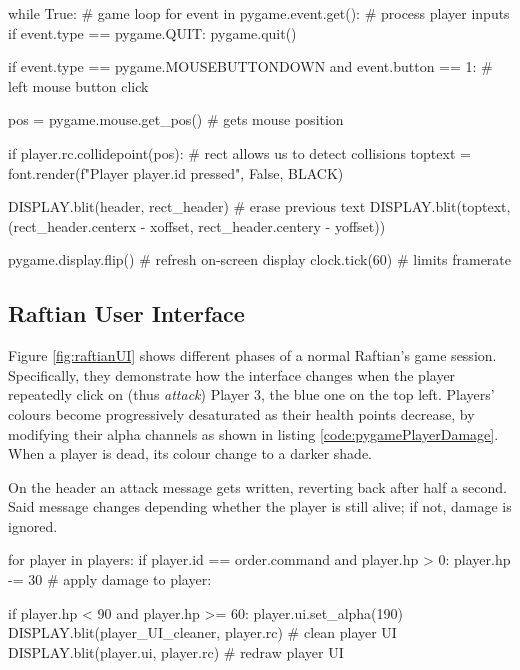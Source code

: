 \begin{python}[label={code:pygameLoop}, caption={All interactions and frame-by-frame rendering happen in the game loop}]
while True: # game loop
    for event in pygame.event.get():    # process player inputs
        if event.type == pygame.QUIT:
            pygame.quit()

        if event.type == pygame.MOUSEBUTTONDOWN and event.button == 1:  # left mouse button click

            pos = pygame.mouse.get_pos() # gets mouse position

            if player.rc.collidepoint(pos): # rect allows us to detect collisions
                toptext = font.render(f"Player {player.id} pressed", False, BLACK)

                DISPLAY.blit(header, rect_header)   # erase previous text
                DISPLAY.blit(toptext, (rect_header.centerx - xoffset, rect_header.centery - yoffset))

    pygame.display.flip()  # refresh on-screen display
    clock.tick(60)         # limits framerate
\end{python}

\subsection{Raftian User Interface}

Figure \ref{fig:raftianUI} shows different phases of a normal Raftian's game session. Specifically, they demonstrate how the interface changes when the player repeatedly click on (thus \textit{attack}) Player 3, the blue one on the top left. Players' colours become progressively desaturated as their health points decrease, by modifying their alpha channels as shown in listing \ref{code:pygamePlayerDamage}. When a player is dead, its colour change to a darker shade. 

On the header an attack message gets written, reverting back after half a second. Said message changes depending whether the player is still alive; if not, damage is ignored. 

\begin{python}[label={code:pygamePlayerDamage}, caption={All interactions and frame-by-frame rendering happen in the game loop}]
for player in players:
    if player.id == order.command and player.hp > 0:
        player.hp -= 30  # apply damage to player:

        if player.hp < 90 and player.hp >= 60:
            player.ui.set_alpha(190)
            DISPLAY.blit(player_UI_cleaner, player.rc)  # clean player UI
            DISPLAY.blit(player.ui, player.rc)          # redraw player UI
\end{python}


